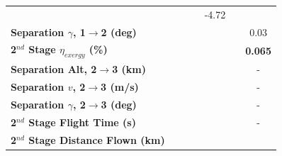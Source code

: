 \begin{table}[ht]
\begin{tabular}{l c c c c c c}
		& \firstsecondSeparationvmThreeStandardNoReturn
		& \firstsecondSeparationvmThreeOneHundredFiveNoReturn
		& \firstsecondSeparationvmThreeOneHundredTenNoReturn
		&-4.72
		\\
		\textbf{Separation $\gamma$, 1$\rightarrow$2 (deg)}
		& \firstsecondSeparationgammamThreeNinetyNoReturn
		& \firstsecondSeparationgammamThreeNinetyFiveNoReturn
		& \firstsecondSeparationgammamThreeStandardNoReturn
		& \firstsecondSeparationgammamThreeOneHundredFiveNoReturn
		& \firstsecondSeparationgammamThreeOneHundredTenNoReturn
		&0.03
		\\
		\hline 
		\textbf{2$^{nd}$ Stage $\eta_{exergy}$ (\%)}
		& \textbf{\secondExergyEffmThreeNinetyNoReturn}
		& \textbf{\secondExergyEffmThreeNinetyFiveNoReturn}
		& \textbf{\secondExergyEffmThreeStandardNoReturn}
		& \textbf{\secondExergyEffmThreeOneHundredFiveNoReturn}
		& \textbf{\secondExergyEffmThreeOneHundredTenNoReturn}
		& \textbf{0.065}
		\\
		\textbf{Separation Alt, 2$\rightarrow$3 (km)}
		& \secondthirdSeparationAltmThreeNinetyNoReturn
		& \secondthirdSeparationAltmThreeNinetyFiveNoReturn
		& \secondthirdSeparationAltmThreeStandardNoReturn
		& \secondthirdSeparationAltmThreeOneHundredFiveNoReturn
		& \secondthirdSeparationAltmThreeOneHundredTenNoReturn
		& -
		\\
		\textbf{Separation $v$, 2$\rightarrow$3 (m/s)}
		& \secondthirdSeparationvmThreeNinetyNoReturn
		& \secondthirdSeparationvmThreeNinetyFiveNoReturn
		& \secondthirdSeparationvmThreeStandardNoReturn
		& \secondthirdSeparationvmThreeOneHundredFiveNoReturn
		& \secondthirdSeparationvmThreeOneHundredTenNoReturn
		& -
		\\
		\textbf{Separation $\gamma$, 2$\rightarrow$3 (deg)}
		& \secondthirdSeparationgammamThreeNinetyNoReturn
		& \secondthirdSeparationgammamThreeNinetyFiveNoReturn
		& \secondthirdSeparationgammamThreeStandardNoReturn
		& \secondthirdSeparationgammamThreeOneHundredFiveNoReturn
		& \secondthirdSeparationgammamThreeOneHundredTenNoReturn
		& -
		\\
		\textbf{2$^{nd}$ Stage Flight Time (s)}
		& \secondFlightTimemThreeNinetyNoReturn
		& \secondFlightTimemThreeNinetyFiveNoReturn
		& \secondFlightTimemThreeStandardNoReturn
		& \secondFlightTimemThreeOneHundredFiveNoReturn
		& \secondFlightTimemThreeOneHundredTenNoReturn
		& -
		\\
		\textbf{2$^{nd}$ Stage Distance Flown (km)}
		& \SecondDistmThreeNinetyNoReturn
		& \SecondDistmThreeNinetyFiveNoReturn
		& \SecondDistmThreeStandardNoReturn
		& \SecondDistmThreeOneHundredFiveNoReturn

\end{tabular}
\end{table}
